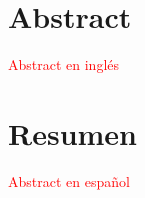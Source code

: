 \thispagestyle{plain}


\vspace{-30pt}
\section*{Abstract}

\textcolor{red}{Abstract en inglés}

\section*{Resumen}

\textcolor{red}{Abstract en español}

\newpage
\thispagestyle{empty}

